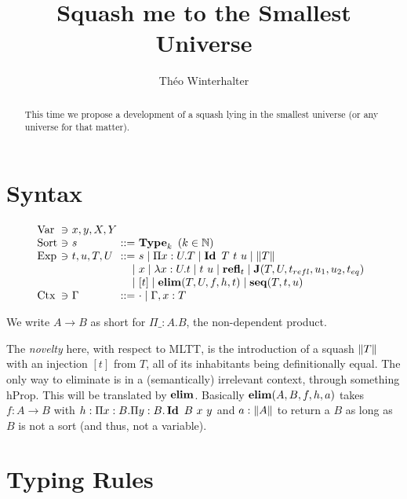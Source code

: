 \documentclass[a4paper,english]{lipics-utf8x}
\title{Squash me to the Smallest Universe}
\author[1]{Théo Winterhalter}
\begin{document}
  \maketitle

  \begin{abstract}
    This time we propose a development of a squash lying in the smallest
    universe (or any universe for that matter).
  \end{abstract}

  \section{Syntax}

  \[
    \begin{array}{l@{~}l@{~}l@{~}r@{~}l@{\quad}l}
      \Var  & \ni & x,y,X,Y \\
      \Sort & \ni & s             & ::= & \Type_k \mbox{ }
                                                (k \in \mathbb{N}) \\
      \Exp  & \ni & t,u,T,U & ::= & s \mid \Pi x:U.T \mid
                                    \Id T\ t\ u \mid \squash{T} \\
                         &&& \mid & x \mid \lambda x:U.t \mid t~u
                               \mid \refl_t \mid
                               \J (T,U,t_{refl},u_1,u_2,t_{eq}) \\
                         &&& \mid & [t] \mid \elim(T,U,f,h,t)
                             \mid \seq(T,t,u) \\
      \Ctx  & \ni & \Gamma  & ::= & \cdot \mid \Gamma, x:T \\
    \end{array}
  \]

  \noindent %
  We write $A \to B$ as short for $\Pi \_:A.B$, the non-dependent product.

  The \emph{novelty} here, with respect to MLTT, is the introduction of a squash
  $\|T\|$ with an injection $[t]$ from $T$, all of its inhabitants being
  definitionally equal. The only way to eliminate is in a (semantically)
  irrelevant context, \ie through something hProp.
  This will be translated by $\operatorname{\mathbf{elim}}$.
  Basically $\operatorname{\mathbf{elim}}(A,B,f,h,a)$ takes $f : A \to B$ with
  $h : \Pi x:B. \Pi y:B. \Id B\ x\ y$ and $a : \|A\|$ to return a $B$
  as long as $B$ is not a sort (and thus, not a variable).

  \section{Typing Rules}
\end{document}
